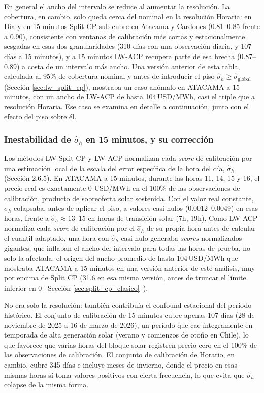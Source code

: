 En general el ancho del intervalo se reduce al aumentar la resolución. La cobertura, en cambio, solo queda cerca del nominal en la resolución Horaria: en Día y en 15 minutos Split CP sub-cubre en Atacama y Cardones (0.81--0.85 frente a 0.90), consistente con ventanas de calibración más cortas y estacionalmente sesgadas en esas dos granularidades (310 días con una observación diaria, y 107 días a 15 minutos), y a 15 minutos LW-ACP recupera parte de esa brecha (0.87--0.89) a costa de un intervalo más ancho. Una versión anterior de esta tabla, calculada al 95\% de cobertura nominal y antes de introducir el piso $\hat\sigma_h \geq \hat\sigma_{\text{global}}$ (Sección \ref{sec:lw_split_cp}), mostraba un caso anómalo en ATACAMA a 15 minutos, con un ancho de LW-ACP de hasta 104\,USD/MWh, casi el triple que a resolución Horaria. Ese caso se examina en detalle a continuación, junto con el efecto del piso sobre él.

\subsubsection{Inestabilidad de $\hat\sigma_h$ en 15 minutos, y su corrección}

Los métodos LW Split CP y LW-ACP normalizan cada \textit{score} de calibración por una estimación local de la escala del error específica de la hora del día, $\hat\sigma_h$ (Sección 2.6.5). En ATACAMA a 15 minutos, durante las horas 11, 14, 15 y 16, el precio real es exactamente 0 USD/MWh en el 100\% de las observaciones de calibración, producto de sobreoferta solar sostenida. Con el valor real constante, $\hat\sigma_h$ colapsaba, antes de aplicar el piso, a valores casi nulos (0.0012--0.0049) en esas horas, frente a $\hat\sigma_h \approx 13$--$15$ en horas de transición solar (7h, 19h). Como LW-ACP normaliza cada \textit{score} de calibración por el $\hat\sigma_h$ de su propia hora antes de calcular el cuantil adaptado, una hora con $\hat\sigma_h$ casi nulo generaba \textit{scores} normalizados gigantes, que inflaban el ancho del intervalo para todas las horas de prueba, no solo la afectada: el origen del ancho promedio de hasta 104\,USD/MWh que mostraba ATACAMA a 15 minutos en una versión anterior de este análisis, muy por encima de Split CP (31.6 en esa misma versión, antes de truncar el límite inferior en 0 --Sección \ref{sec:split_cp_clasico}--).

No era solo la resolución: también contribuía el confound estacional del período histórico. El conjunto de calibración de 15 minutos cubre apenas 107 días (28 de noviembre de 2025 a 16 de marzo de 2026), un período que cae íntegramente en temporada de alta generación solar (verano y comienzos de otoño en Chile), lo que favorece que varias horas del bloque solar registren precio cero en el 100\% de las observaciones de calibración. El conjunto de calibración de Horario, en cambio, cubre 345 días e incluye meses de invierno, donde el precio en esas mismas horas sí toma valores positivos con cierta frecuencia, lo que evita que $\hat\sigma_h$ colapse de la misma forma.

